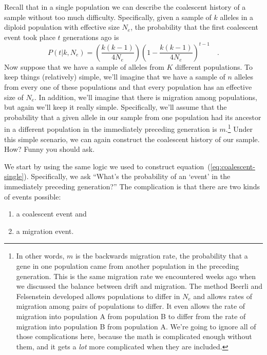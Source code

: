 Recall that in a single population we can describe the coalescent
history of a sample without too much difficulty. Specifically, given a
sample of $k$ alleles in a diploid population with effective size
$N_e$, the probability that the first coalescent event took place $t$
generations ago is
\begin{equation}
P(t|k, N_e) = \left(\frac{k(k-1)}{4N_e}\right)\left(1-
  \frac{k(k-1)}{4N_e}\right)^{t-1} \quad . \label{eq:coalescent-single}
\end{equation}
Now suppose that we have a sample of alleles from $K$ different
populations. To keep things (relatively) simple, we'll imagine that we
have a sample of $n$ alleles from every one of these populations and
that every population has an effective size of $N_e$. In addition,
we'll imagine that there is migration among populations, but again
we'll keep it really simple. Specifically, we'll assume that the
probability that a given allele in our sample from one population had
its ancestor in a different population in the immediately preceding
generation is $m$.\footnote{In other words, $m$ is the backwards
  migration rate, the probability that a gene in one population came
  from another population in the preceding generation. This is the
  same migration rate we encountered weeks ago when we discussed the
  balance between drift and migration. The method Beerli and
  Felsenstein developed allows populations to differ in $N_e$ and
  allows rates of migration among pairs of populations to differ. It
  even allows the rate of migration into population A from population
  B to differ from the rate of migration into population B from
  population A. We're going to ignore all of those complications here,
  because the math is complicated enough without them, and it gets a
  {\it lot\/} more complicated when they are included.} Under this
simple scenario, we can again construct the coalescent history of our
sample. How? Funny you should ask.

We start by using the same logic we used to construct
equation~(\ref{eq:coalescent-single}). Specifically, we ask ``What's
the probability of an `event' in the immediately preceding
generation?'' The complication is that there are two kinds of events
possible: 

\begin{enumerate}

\item a coalescent event and 

\item a migration event. 

\end{enumerate}

